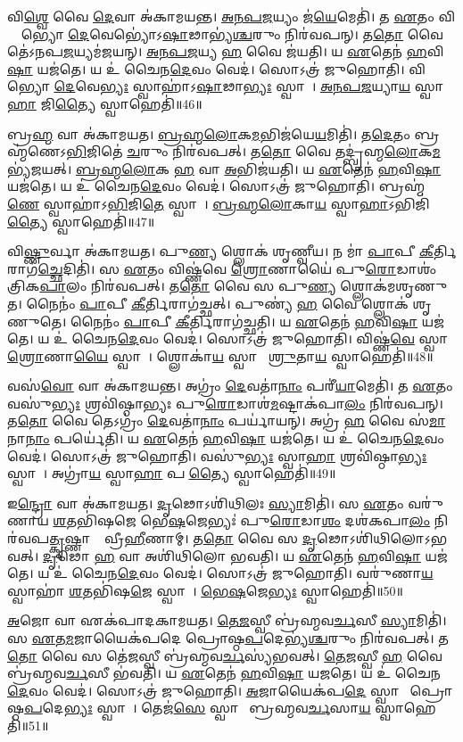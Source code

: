 𑌵𑌿\ul{𑌶𑍍𑌵𑍇} 𑌵𑍈 \ul{𑌦𑍇}𑌵𑌾 𑌅॑𑌕𑌾𑌮𑌯𑌨𑍍𑌤।
\ul{𑌅}\ul{𑌨}\ul{𑌪}\ul{𑌜}𑌯𑍍𑌯𑌂 𑌜॑\ul{𑌯𑍇}𑌮𑍇𑌤𑌿॑।
𑌤 \ul{𑌏}𑌤𑌂 𑌵𑌿𑌶𑍍𑌵𑍇᳚𑌭𑍍𑌯𑍋 \ul{𑌦𑍇}𑌵𑍇𑌭𑍍𑌯𑍋॑\-𑌽\ul{𑌷𑌾}𑌢𑌾𑌭𑍍𑌯॑\ul{𑌶𑍍𑌚}𑌰𑍁𑌂 𑌨𑌿𑌰॑𑌵𑌪𑌨𑍍।
𑌤\ul{𑌤𑍋} 𑌵𑍈 𑌤𑍇॑\-𑌽𑌨𑌪\ul{𑌜}𑌯𑍍𑌯𑌮॑𑌜𑌯𑌨𑍍।
\ul{𑌅}\ul{𑌨}\ul{𑌪}\ul{𑌜}𑌯𑍍𑌯 \ul{𑌹} 𑌵𑍈 𑌜॑𑌯𑌤𑌿।
𑌯 \ul{𑌏}𑌤𑍇𑌨॑ \ul{𑌹}𑌵𑌿\ul{𑌷𑌾} 𑌯𑌜॑𑌤𑍇।
𑌯 𑌉॑ 𑌚𑍈𑌨\ul{𑌦𑍇}𑌵𑌂 𑌵𑍇𑌦॑।
𑌸𑍋𑌽𑌤𑍍𑌰॑ 𑌜𑍁𑌹𑍋𑌤𑌿।
𑌵𑌿𑌶𑍍𑌵𑍇᳚𑌭𑍍𑌯𑍋 \ul{𑌦𑍇}𑌵𑍇\ul{𑌭𑍍𑌯𑌃} 𑌸𑍍𑌵𑌾𑌹𑌾॑\-𑌽\ul{𑌷𑌾}𑌢𑌾\ul{𑌭𑍍𑌯𑌃} 𑌸𑍍𑌵𑌾𑌹𑌾᳚।
\ul{𑌅}\ul{𑌨}\ul{𑌪}\ul{𑌜}𑌯𑍍𑌯𑌾\ul{𑌯} 𑌸𑍍𑌵𑌾\ul{𑌹𑌾} 𑌜𑌿\ul{𑌤𑍍𑌯𑍈} 𑌸𑍍𑌵𑌾𑌹𑍇𑌤𑌿॑॥46॥

𑌬𑍍𑌰\ul{𑌹𑍍𑌮} 𑌵𑌾 𑌅॑𑌕𑌾𑌮𑌯𑌤।
\ul{𑌬𑍍𑌰}\ul{𑌹𑍍𑌮}\ul{𑌲𑍋}𑌕\ul{𑌮}𑌭𑌿𑌜॑𑌯𑍇\ul{𑌯}𑌮𑌿𑌤𑌿॑।
𑌤\ul{𑌦𑍇}𑌤𑌂 𑌬𑍍𑌰𑌹𑍍𑌮॑𑌣𑍇\-𑌽\ul{𑌭𑌿}𑌜𑌿𑌤𑍇॑ \ul{𑌚}𑌰𑍁𑌂 𑌨𑌿𑌰॑𑌵𑌪𑌤𑍍।
𑌤\ul{𑌤𑍋} 𑌵𑍈 𑌤𑌦𑍍𑌬𑍍𑌰॑𑌹𑍍𑌮\ul{𑌲𑍋}𑌕\ul{𑌮}𑌭𑍍𑌯॑𑌜𑌯𑌤𑍍।
\ul{𑌬𑍍𑌰}\ul{𑌹𑍍𑌮}\ul{𑌲𑍋}𑌕 \ul{𑌹} 𑌵𑌾 \ul{𑌅}𑌭𑌿𑌜॑𑌯𑌤𑌿।
𑌯 \ul{𑌏}𑌤𑍇𑌨॑ \ul{𑌹}𑌵𑌿\ul{𑌷𑌾} 𑌯𑌜॑𑌤𑍇।
𑌯 𑌉॑ 𑌚𑍈𑌨\ul{𑌦𑍇}𑌵𑌂 𑌵𑍇𑌦॑।
𑌸𑍋𑌽𑌤𑍍𑌰॑ 𑌜𑍁𑌹𑍋𑌤𑌿।
𑌬𑍍𑌰𑌹𑍍𑌮॑\ul{𑌣𑍇} 𑌸𑍍𑌵𑌾𑌹𑌾॑\-𑌽\ul{𑌭𑌿}𑌜𑌿\ul{𑌤𑍇} 𑌸𑍍𑌵𑌾𑌹𑌾᳚।
\ul{𑌬𑍍𑌰}\ul{𑌹𑍍𑌮}\ul{𑌲𑍋}𑌕𑌾\ul{𑌯} 𑌸𑍍𑌵𑌾\ul{𑌹𑌾}\-𑌽𑌭𑌿𑌜𑌿॑\ul{𑌤𑍍𑌯𑍈} 𑌸𑍍𑌵𑌾𑌹𑍇𑌤𑌿॑॥47॥

𑌵𑌿\ul{𑌷𑍍𑌣𑍁}𑌰𑍍𑌵𑌾 𑌅॑𑌕𑌾𑌮𑌯𑌤।
𑌪𑍁\ul{𑌣𑍍𑌯}\ul{} 𑌶𑍍𑌲𑍋𑌕॑ 𑌶𑍃𑌣𑍍𑌵𑍀𑌯।
𑌨 𑌮𑌾॑ \ul{𑌪𑌾}𑌪𑍀 \ul{𑌕𑍀}𑌰𑍍𑌤𑌿𑌰𑌾𑌗॑\ul{𑌚𑍍𑌛𑍇}𑌦𑌿𑌤𑌿॑।
𑌸 \ul{𑌏}𑌤𑌂 𑌵𑌿𑌷𑍍𑌣॑𑌵𑍇 \ul{𑌶𑍍𑌰𑍋}𑌣𑌾𑌯𑍈॑ 𑌪𑍁\ul{𑌰𑍋}𑌡𑌾𑌶𑌂॑ 𑌤𑍍𑌰𑌿𑌕\ul{𑌪𑌾}𑌲𑌂 𑌨𑌿𑌰॑𑌵𑌪𑌤𑍍।
𑌤\ul{𑌤𑍋} 𑌵𑍈 𑌸 𑌪𑍁\ul{𑌣𑍍𑌯}\ul{} 𑌶𑍍𑌲𑍋𑌕॑𑌮𑌶𑍃𑌣𑍁𑌤।
𑌨𑍈𑌨𑌂॑ \ul{𑌪𑌾}𑌪𑍀 \ul{𑌕𑍀}𑌰𑍍𑌤𑌿𑌰𑌾𑌗॑𑌚𑍍𑌛𑌤𑍍।
𑌪𑍁𑌣𑍍𑌯॑ \ul{𑌹} 𑌵𑍈 𑌶𑍍𑌲𑍋𑌕॑ 𑌶𑍃𑌣𑍁𑌤𑍇।
𑌨𑍈𑌨𑌂॑ \ul{𑌪𑌾}𑌪𑍀 \ul{𑌕𑍀}𑌰𑍍𑌤𑌿𑌰𑌾𑌗॑𑌚𑍍𑌛𑌤𑌿।
𑌯 \ul{𑌏}𑌤𑍇𑌨॑ \ul{𑌹}𑌵𑌿\ul{𑌷𑌾} 𑌯𑌜॑𑌤𑍇।
𑌯 𑌉॑ 𑌚𑍈𑌨\ul{𑌦𑍇}𑌵𑌂 𑌵𑍇𑌦॑।
𑌸𑍋𑌽𑌤𑍍𑌰॑ 𑌜𑍁𑌹𑍋𑌤𑌿।
𑌵𑌿𑌷𑍍𑌣॑\ul{𑌵𑍇} 𑌸𑍍𑌵𑌾𑌹𑌾᳚ \ul{𑌶𑍍𑌰𑍋}𑌣𑌾\ul{𑌯𑍈} 𑌸𑍍𑌵𑌾𑌹𑌾᳚।
𑌶𑍍𑌲𑍋𑌕𑌾॑\ul{𑌯} 𑌸𑍍𑌵𑌾𑌹𑌾᳚ \ul{𑌶𑍍𑌰𑍁}𑌤𑌾\ul{𑌯} 𑌸𑍍𑌵𑌾𑌹𑍇𑌤𑌿॑॥48॥

𑌵𑌸॑\ul{𑌵𑍋} 𑌵𑌾 𑌅॑𑌕𑌾𑌮𑌯𑌨𑍍𑌤।
𑌅𑌗𑍍𑌰𑌂॑ \ul{𑌦𑍇}𑌵𑌤𑌾॑\ul{𑌨𑌾𑌂} 𑌪𑌰𑍀॑\ul{𑌯𑌾}𑌮𑍇𑌤𑌿॑।
𑌤 \ul{𑌏}𑌤𑌂 𑌵𑌸𑍁॑\ul{𑌭𑍍𑌯𑌃} 𑌶𑍍𑌰𑌵𑌿॑𑌷𑍍𑌠𑌾𑌭𑍍𑌯𑌃 𑌪𑍁\ul{𑌰𑍋}𑌡𑌾𑌶॑\ul{𑌮}𑌷𑍍𑌟𑌾𑌕॑𑌪𑌾\ul{𑌲𑌂} 𑌨𑌿𑌰॑𑌵𑌪𑌨𑍍।
𑌤\ul{𑌤𑍋} 𑌵𑍈 𑌤𑍇𑌽𑌗𑍍𑌰𑌂॑ \ul{𑌦𑍇}𑌵𑌤𑌾॑\ul{𑌨𑌾𑌂} 𑌪𑌰𑍍𑌯𑌾॑𑌯𑌨𑍍।
𑌅𑌗𑍍𑌰॑ \ul{𑌹} 𑌵𑍈 𑌸॑\ul{𑌮𑌾}𑌨𑌾\ul{𑌨𑌾𑌂} 𑌪𑌰𑍍𑌯𑍇॑𑌤𑌿।
𑌯 \ul{𑌏}𑌤𑍇𑌨॑ \ul{𑌹}𑌵𑌿\ul{𑌷𑌾} 𑌯𑌜॑𑌤𑍇।
𑌯 𑌉॑ 𑌚𑍈𑌨\ul{𑌦𑍇}𑌵𑌂 𑌵𑍇𑌦॑।
𑌸𑍋𑌽𑌤𑍍𑌰॑ 𑌜𑍁𑌹𑍋𑌤𑌿।
𑌵𑌸𑍁॑\ul{𑌭𑍍𑌯𑌃} 𑌸𑍍𑌵𑌾\ul{𑌹𑌾} 𑌶𑍍𑌰𑌵𑌿॑𑌷𑍍𑌠𑌾\ul{𑌭𑍍𑌯𑌃} 𑌸𑍍𑌵𑌾𑌹𑌾᳚।
𑌅𑌗𑍍𑌰𑌾॑\ul{𑌯} 𑌸𑍍𑌵𑌾\ul{𑌹𑌾} 𑌪𑌰𑍀᳚\ul{𑌤𑍍𑌯𑍈} 𑌸𑍍𑌵𑌾𑌹𑍇𑌤𑌿॑॥49॥

𑌇\ul{𑌨𑍍𑌦𑍍𑌰𑍋} 𑌵𑌾 𑌅॑𑌕𑌾𑌮𑌯𑌤।
\ul{𑌦𑍃}𑌢𑍋\-𑌽𑌶𑌿॑𑌥𑌿𑌲𑌃 \ul{𑌸𑍍𑌯𑌾}𑌮𑌿𑌤𑌿॑।
𑌸 \ul{𑌏}𑌤𑌂 𑌵𑌰𑍁॑𑌣𑌾𑌯 \ul{𑌶}𑌤𑌭𑌿॑𑌷𑌜𑍇 𑌭𑍇\ul{𑌷}𑌜𑍇𑌭𑍍𑌯𑌃॑ 𑌪𑍁\ul{𑌰𑍋}𑌡𑌾\ul{𑌶𑌂} 𑌦𑌶॑𑌕𑌪𑌾\ul{𑌲𑌂} 𑌨𑌿𑌰॑𑌵𑌪\ul{𑌤𑍍𑌕𑍃}𑌷𑍍𑌣𑌾𑌨𑌾𑌂᳚ 𑌵𑍍𑌰𑍀\ul{𑌹𑍀}𑌣𑌾𑌮𑍍।
𑌤\ul{𑌤𑍋} 𑌵𑍈 𑌸 \ul{𑌦𑍃}𑌢𑍋\-𑌽𑌶𑌿॑𑌥𑌿𑌲𑍋\-𑌽𑌭𑌵𑌤𑍍।
\ul{𑌦𑍃}𑌢𑍋 \ul{𑌹} 𑌵𑌾 𑌅𑌶𑌿॑𑌥𑌿𑌲𑍋 𑌭𑌵𑌤𑌿।
𑌯 \ul{𑌏}𑌤𑍇𑌨॑ \ul{𑌹}𑌵𑌿\ul{𑌷𑌾} 𑌯𑌜॑𑌤𑍇।
𑌯 𑌉॑ 𑌚𑍈𑌨\ul{𑌦𑍇}𑌵𑌂 𑌵𑍇𑌦॑।
𑌸𑍋𑌽𑌤𑍍𑌰॑ 𑌜𑍁𑌹𑍋𑌤𑌿।
𑌵𑌰𑍁॑𑌣𑌾\ul{𑌯} 𑌸𑍍𑌵𑌾𑌹𑌾॑ \ul{𑌶}𑌤𑌭𑌿॑𑌷\ul{𑌜𑍇} 𑌸𑍍𑌵𑌾𑌹𑌾᳚।
\ul{𑌭𑍇}\ul{𑌷}𑌜𑍇\ul{𑌭𑍍𑌯𑌃} 𑌸𑍍𑌵𑌾𑌹𑍇𑌤𑌿॑॥50॥

\ul{𑌅}𑌜𑍋 𑌵𑌾 𑌏𑌕॑𑌪𑌾𑌦𑌕𑌾𑌮𑌯𑌤।
\ul{𑌤𑍇}\ul{𑌜}𑌸𑍍𑌵𑍀 𑌬𑍍𑌰॑𑌹𑍍𑌮𑌵\ul{𑌰𑍍𑌚}𑌸𑍀 \ul{𑌸𑍍𑌯𑌾}𑌮𑌿𑌤𑌿॑।
𑌸 \ul{𑌏}𑌤\ul{𑌮}𑌜𑌾𑌯𑍈𑌕॑𑌪𑌦𑍇 𑌪𑍍𑌰𑍋𑌷𑍍𑌠\ul{𑌪}𑌦𑍇𑌭𑍍𑌯॑\ul{𑌶𑍍𑌚}𑌰𑍁𑌂 𑌨𑌿𑌰॑𑌵𑌪𑌤𑍍।
𑌤\ul{𑌤𑍋} 𑌵𑍈 𑌸 𑌤𑍇॑\ul{𑌜}𑌸𑍍𑌵𑍀 𑌬𑍍𑌰॑𑌹𑍍𑌮𑌵\ul{𑌰𑍍𑌚}𑌸𑍍𑌯॑𑌭𑌵𑌤𑍍।
\ul{𑌤𑍇}\ul{𑌜}𑌸𑍍𑌵𑍀 \ul{𑌹} 𑌵𑍈 𑌬𑍍𑌰॑𑌹𑍍𑌮𑌵\ul{𑌰𑍍𑌚}𑌸𑍀 𑌭॑𑌵𑌤𑌿।
𑌯 \ul{𑌏}𑌤𑍇𑌨॑ \ul{𑌹}𑌵𑌿\ul{𑌷𑌾} 𑌯𑌜𑌤𑍇।
𑌯 𑌉॑ 𑌚𑍈𑌨\ul{𑌦𑍇}𑌵𑌂 𑌵𑍇𑌦॑।
𑌸𑍋𑌽𑌤𑍍𑌰॑ 𑌜𑍁𑌹𑍋𑌤𑌿।
\ul{𑌅}𑌜𑌾𑌯𑍈𑌕॑𑌪\ul{𑌦𑍇} 𑌸𑍍𑌵𑌾𑌹𑌾᳚ 𑌪𑍍𑌰𑍋𑌷𑍍𑌠\ul{𑌪}𑌦𑍇\ul{𑌭𑍍𑌯𑌃} 𑌸𑍍𑌵𑌾𑌹𑌾᳚।
𑌤𑍇𑌜॑\ul{𑌸𑍇} 𑌸𑍍𑌵𑌾𑌹𑌾᳚ 𑌬𑍍𑌰𑌹𑍍𑌮𑌵\ul{𑌰𑍍𑌚}𑌸𑌾\ul{𑌯} 𑌸𑍍𑌵𑌾𑌹𑍇𑌤𑌿॑॥51॥

